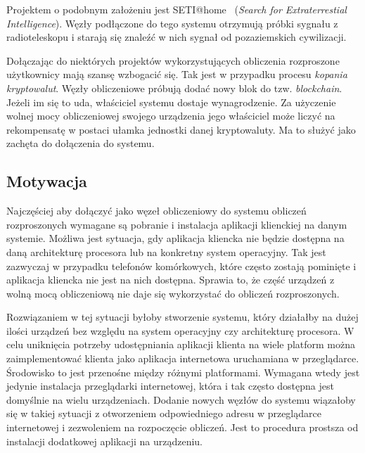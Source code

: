 \documentclass[a4paper,11pt,twoside]{report}
\theoremstyle{definition}
\begin{document}
    Projektem o podobnym założeniu jest SETI@home~\cite{SETI} (\textit{\textit{Search for Extraterrestial Intelligence}}).
    Węzły podłączone do tego systemu otrzymują próbki sygnału z radioteleskopu i starają się znaleźć w nich sygnał od pozaziemskich cywilizacji.
    
    Dołączając do niektórych projektów wykorzystujących obliczenia rozproszone użytkownicy mają szansę wzbogacić się.
    Tak jest w przypadku procesu \textit{kopania kryptowalut}.
    Węzły obliczeniowe próbują dodać nowy blok do tzw. \textit{blockchain}.
    Jeżeli im się to uda, właściciel systemu dostaje wynagrodzenie.
    Za użyczenie wolnej mocy obliczeniowej swojego urządzenia jego właściciel może liczyć na rekompensatę w postaci ułamka jednostki danej kryptowaluty.
    Ma to służyć jako zachęta do dołączenia do systemu.
    
    \subsection{Motywacja}
    
    Najczęściej aby dołączyć jako węzeł obliczeniowy do systemu obliczeń rozproszonych wymagane są
    pobranie i instalacja aplikacji klienckiej na danym systemie.
    Możliwa jest sytuacja, gdy aplikacja kliencka nie będzie dostępna na daną architekturę procesora
    lub na konkretny system operacyjny.
    Tak jest zazwyczaj w przypadku telefonów komórkowych, które często zostają pominięte i aplikacja
    kliencka nie jest na nich dostępna.
    Sprawia to, że część urządzeń z wolną mocą obliczeniową nie daje się wykorzystać do obliczeń
    rozproszonych.
    
    Rozwiązaniem w tej sytuacji byłoby stworzenie systemu, który działałby na dużej ilości urządzeń
    bez względu na system operacyjny czy architekturę procesora.
    W celu uniknięcia potrzeby udostępniania aplikacji klienta na wiele platform można zaimplementować
    klienta jako aplikacja internetowa uruchamiana w przeglądarce. Środowisko to jest przenośne
    między różnymi platformami. Wymagana wtedy jest jedynie instalacja przeglądarki internetowej,
    która i tak często dostępna jest domyślnie na wielu urządzeniach.
    Dodanie nowych węzłów do systemu wiązałoby się w takiej sytuacji z otworzeniem odpowiedniego
    adresu w przeglądarce internetowej i zezwoleniem na rozpoczęcie obliczeń.
    Jest to procedura prostsza od instalacji dodatkowej aplikacji na urządzeniu.
    
\end{document}
